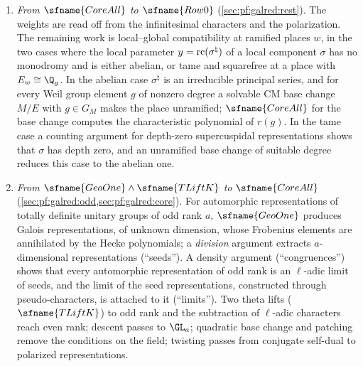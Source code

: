 \begin{enumerate}[label=(\alph*),nosep]
\item \emph{From $\sfname{CoreAll}$ to $\sfname{Row0}$} (\cref{sec:pf:galred:rest}). The weights are read off from
  the infinitesimal characters and the polarization. The remaining work is local--global compatibility at
  ramified places $w$, in the two cases where the local parameter $y=\mathrm{rc}(\sigma^\natural)$ of a local
  component $\sigma$ has no monodromy and is either abelian, or tame and squarefree at a place with $E_w\cong\Q_g$.
  In the abelian case $\sigma^\natural$ is an irreducible principal series, and for every Weil group element $g$
  of nonzero degree a solvable CM base change $M/E$ with $g\in G_M$ makes the place unramified; $\sfname{CoreAll}$
  for the base change computes the characteristic polynomial of $r(g)$. In the tame case a counting argument for
  depth-zero supercuspidal representations shows that $\sigma$ has depth zero, and an unramified base change of
  suitable degree reduces this case to the abelian one.
\item \emph{From $\sfname{GeoOne}\wedge\sfname{TLiftK}$ to $\sfname{CoreAll}$}
  (\cref{sec:pf:galred:odd,sec:pf:galred:core}). For automorphic representations of totally definite unitary
  groups of odd rank $a$, $\sfname{GeoOne}$ produces Galois representations, of unknown dimension, whose
  Frobenius elements are annihilated by the Hecke polynomials; a \emph{division} argument extracts
  $a$-dimensional representations (``seeds''). A density argument (``congruences'') shows that every
  automorphic representation of odd rank is an $\ell$-adic limit of seeds, and the limit of the seed
  representations, constructed through pseudo-characters, is attached to it (``limits''). Two theta lifts
  ($\sfname{TLiftK}$) to odd rank and the subtraction of $\ell$-adic characters reach even rank; descent
  passes to $\GL_a$; quadratic base change and patching remove the conditions on the field; twisting passes
  from conjugate self-dual to polarized representations.
\end{enumerate}

